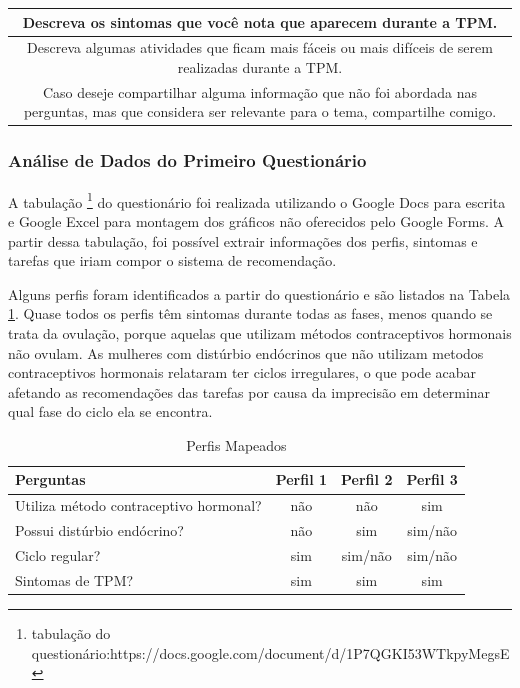\begin{table}[ht]
\begin{tabular}{c}
        \midrule
        \begin{minipage} [t] {1\textwidth} Descreva os sintomas que você nota que aparecem durante a TPM.\end{minipage}\\
        \midrule
        \begin{minipage} [t] {1\textwidth} Descreva algumas atividades que ficam mais fáceis ou mais difíceis de serem realizadas durante a TPM.\end{minipage}\\
        \midrule
        \begin{minipage} [t] {1\textwidth} Caso deseje compartilhar alguma informação que não foi abordada nas perguntas, mas que considera ser relevante para o tema, compartilhe comigo. \end{minipage}\\

        \bottomrule
    \end{tabular} 
\end{table}


\subsubsection{Análise de Dados do Primeiro Questionário}

A tabulação \footnote{tabulação do questionário:https://docs.google.com/document/d/1P7QGKI53WTkpyMegsE} do 
questionário foi realizada utilizando o Google Docs para escrita e Google Excel para montagem 
dos gráficos não oferecidos 
pelo Google Forms. A partir dessa tabulação, foi possível extrair informações dos perfis, 
sintomas e tarefas que iriam compor o sistema de recomendação.

Alguns perfis foram identificados a partir do questionário e são listados na Tabela \ref{tab09}. 
Quase todos os perfis têm sintomas durante todas as fases, menos quando se trata da ovulação, porque aquelas 
que utilizam métodos contraceptivos hormonais não ovulam. As mulheres com distúrbio endócrinos 
que não utilizam metodos contraceptivos hormonais relataram ter ciclos irregulares, o que pode acabar afetando 
as recomendações das tarefas por causa da imprecisão em determinar qual fase do ciclo ela se encontra.

\begin{table}[] 
    \centering
    \caption{Perfis Mapeados}
    \label{tab09} 
    \begin{tabular}{|l|c|c|c|}
    \hline
    \rowcolor[HTML]{C0C0C0} 
     Perguntas & Perfil 1 & Perfil 2 & Perfil 3  \\ \hline
     Utiliza método contraceptivo hormonal?& não & não & sim \\ \hline
    \rowcolor[HTML]{EFEFEF} 
    Possui distúrbio endócrino? & não & sim & sim/não \\ \hline
    Ciclo regular? & sim & sim/não & sim/não  \\ \hline
    \rowcolor[HTML]{EFEFEF} 
    Sintomas de TPM? & sim & sim & sim \\ \hline
    \end{tabular}
    \end{table}



